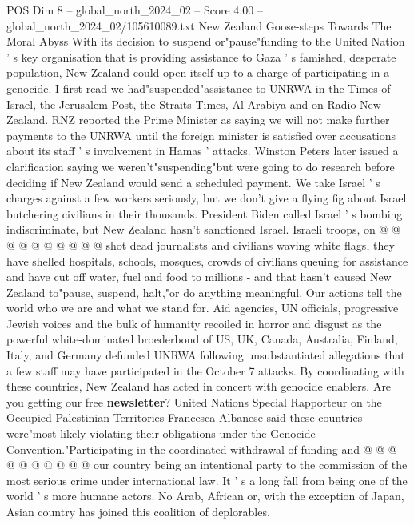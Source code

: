 \begin{textsample}{POS Dim 8 – global\_north\_2024\_02 – Score 4.00 – global\_north\_2024\_02/105610089.txt}  \label{ex:f8_pos_216}
New Zealand Goose-steps Towards The Moral Abyss With its decision to suspend or"pause"funding to the United Nation ' s key organisation that is providing assistance to Gaza ' s famished, desperate population, New Zealand could open itself up to a charge of participating in a genocide.
I first read we had"suspended"assistance to UNRWA in the Times of Israel, the Jerusalem Post, the Straits Times, Al Arabiya and on Radio New Zealand.
RNZ reported the Prime Minister as saying we will not make further payments to the UNRWA until the foreign minister is satisfied over accusations about its staff ' s involvement in Hamas ' attacks.
Winston Peters later issued a clarification saying we weren't"suspending"but were going to do research before deciding if New Zealand would send a scheduled payment.
We take Israel ' s charges against a few workers seriously, but we don't give a flying fig about Israel butchering civilians in their thousands.
President Biden called Israel ' s bombing indiscriminate, but New Zealand hasn't sanctioned Israel.
Israeli troops, on @ @ @ @ @ @ @ @ @ @ shot dead journalists and civilians waving white flags, they have shelled hospitals, schools, mosques, crowds of civilians queuing for assistance and have cut off water, fuel and food to millions - and that hasn't caused New Zealand to"pause, suspend, halt,"or do anything meaningful.
Our actions tell the world who we are and what we stand for.
Aid agencies, UN officials, progressive Jewish voices and the bulk of humanity recoiled in horror and disgust as the powerful white-dominated broederbond of US, UK, Canada, Australia, Finland, Italy, and Germany defunded UNRWA following unsubstantiated allegations that a few staff may have participated in the October 7 attacks.
By coordinating with these countries, New Zealand has acted in concert with genocide enablers.
Are you getting our free \textbf{newsletter}?
United Nations Special Rapporteur on the Occupied Palestinian Territories Francesca Albanese said these countries were"most likely violating their obligations under the Genocide Convention."Participating in the coordinated withdrawal of funding and @ @ @ @ @ @ @ @ @ @ our country being an intentional party to the commission of the most serious crime under international law.
It ' s a long fall from being one of the world ' s more humane actors.
No Arab, African or, with the exception of Japan, Asian country has joined this coalition of deplorables.

\end{textsample}
